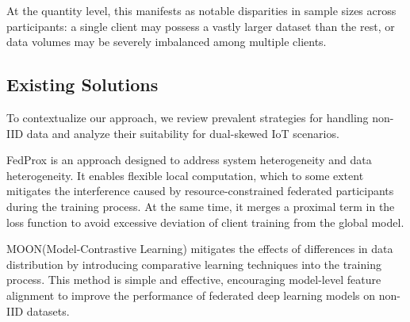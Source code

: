 \documentclass[journal,twoside,web]{ieeecolor}
\begin{document}
At the quantity level, this manifests as notable disparities in sample sizes across participants: a single client may possess a vastly larger dataset than the rest, or data volumes may be severely imbalanced among multiple clients.



\subsection{Existing Solutions}

To contextualize our approach, we review prevalent strategies for handling non-IID data and analyze their suitability for dual-skewed IoT scenarios.

FedProx\cite{fedprox} is an approach designed to address system heterogeneity and data heterogeneity. It enables flexible local computation, which to some extent mitigates the interference caused by resource-constrained federated participants during the training process. At the same time, it merges a proximal term in the loss function to avoid excessive deviation of client training from the global model.

MOON(Model-Contrastive Learning) \cite{moon} mitigates the effects of differences in data distribution by introducing comparative learning techniques into the training process. This method is simple and effective, encouraging model-level feature alignment to improve the performance of federated deep learning models on non-IID datasets. 

\end{document}
